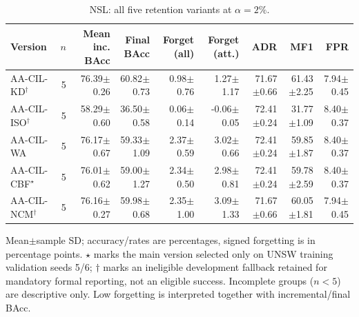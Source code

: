 \begin{table}[t]
\centering\scriptsize
\setlength{\tabcolsep}{3.3pt}
\caption{NSL: all five retention variants at $\alpha=2\%$.}\label{tab:section298-all-nsl_kdd}
\begin{tabular}{lrrrrrrrr}
\toprule
Version & $n$ & Mean inc. BAcc & Final BAcc & Forget (all) & Forget (att.) & ADR & MF1 & FPR \\
\midrule
AA-CIL-KD$^\dagger$ & 5 & 76.39$\pm$0.26 & 60.82$\pm$0.73 & 0.98$\pm$0.76 & 1.27$\pm$1.17 & 71.67$\pm$0.66 & 61.43$\pm$2.25 & 7.94$\pm$0.45 \\
AA-CIL-ISO$^\dagger$ & 5 & 58.29$\pm$0.60 & 36.50$\pm$0.58 & 0.06$\pm$0.14 & -0.06$\pm$0.05 & 72.41$\pm$0.24 & 31.77$\pm$1.09 & 8.40$\pm$0.37 \\
AA-CIL-WA & 5 & 76.17$\pm$0.67 & 59.33$\pm$1.09 & 2.37$\pm$0.59 & 3.02$\pm$0.66 & 72.41$\pm$0.24 & 59.85$\pm$1.87 & 8.40$\pm$0.37 \\
AA-CIL-CBF$^\star$ & 5 & 76.01$\pm$0.62 & 59.00$\pm$1.27 & 2.34$\pm$0.50 & 2.98$\pm$0.81 & 72.41$\pm$0.24 & 59.78$\pm$2.59 & 8.40$\pm$0.37 \\
AA-CIL-NCM$^\dagger$ & 5 & 76.16$\pm$0.27 & 59.98$\pm$0.68 & 2.35$\pm$1.00 & 3.09$\pm$1.33 & 71.67$\pm$0.66 & 60.05$\pm$1.81 & 7.94$\pm$0.45 \\
\bottomrule
\end{tabular}
\par\smallskip\begin{minipage}{0.98\textwidth}\scriptsize Mean$\pm$sample SD; accuracy/rates are percentages, signed forgetting is in percentage points. $\star$ marks the main version selected only on UNSW training validation seeds 5/6; $\dagger$ marks an ineligible development fallback retained for mandatory formal reporting, not an eligible success. Incomplete groups ($n<5$) are descriptive only. Low forgetting is interpreted together with incremental/final BAcc.\end{minipage}
\end{table}

